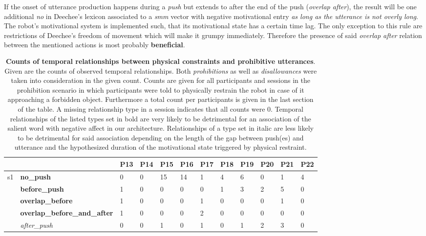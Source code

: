 \begin{screenonly}
If the onset of utterance production happens during a \emph{push} but extends to after the end of the push (\emph{overlap after}), the result will be one
additional \emph{no} in Deechee's lexicon associated to a \emph{smm} vector with negative motivational entry \emph{as long as the utterance is not overly long}.
The robot's motivational system is implemented such, that its motivational state has a certain time lag. The only exception to this rule are restrictions of
Deechee's freedom of movement which will make it grumpy immediately. Therefore the presence of said \emph{overlap after} relation between the mentioned actions
is most probably \textbf{beneficial}.
\begin{table*}[h]
\caption{\textbf{Counts of temporal relationships between physical constraints and prohibitive utterances}. Given are the counts of observed
    temporal relationships. Both \emph{prohibitions} as well as \emph{disallowances} were taken into consideration in the given count. Counts 
    are given for all participants and sessions in the prohibition scenario in which participants were told to physically restrain the robot 
    in case of it approaching a forbidden object. Furthermore a total count per participants is given in the last section of the table. A missing
    relationship type in a session indicates that all counts were 0. Temporal relationships of the listed types set in bold are very likely to be
    detrimental for an association of the salient word with negative affect in our architecture. Relationships of a type set in italic are less likely to be
    detrimental for said association depending on the length of the gap between push(es) and utterance and the hypothesized duration of the 
    motivational state triggered by physical restraint.}
  \label{tbl:prohibition_rel}
\begin{tabular*}{\hsize}{@{\extracolsep{\fill}}llllllllllll}
    \toprule
    &  & P13 & P14 & P15 & P16 & P17 & P18 & P19 & P20 & P21 & P22\\
    \midrule
    \multirow{8}{*}{s1} & \textbf{no\_push} & 0 & 0 & 15 & 14 & 1 & 4 & 6 & 0 & 1 & 4\\
    & \textbf{before\_push} & 1 & 0 & 0 & 0 & 0 & 1 & 3 & 2 & 5 & 0\\
    & \textbf{overlap\_before} & 1 & 0 & 0 & 0 & 1 & 0 & 0 & 0 & 1 & 0\\
    & \textbf{overlap\_before\_and\_after} & 1 & 0 & 0 & 0 & 2 & 0 & 0 & 0 & 0 & 0\\
    & \textsl{after\_push} & 0 & 0 & 1 & 0 & 1 & 0 & 1 & 2 & 3 & 0\\

\end{tabular*}
\end{table*}
\end{screenonly}
